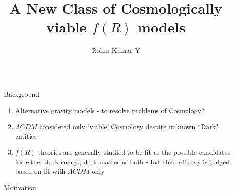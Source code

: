 \documentclass[final,hyperref={pdfpagelabels=false}]{beamer}
\title{\huge A New Class of Cosmologically viable $f(R)$ models} %
\author{Rohin Kumar Y} %
\institute{Department of Physics \& Astrophysics, University of Delhi} %
\begin{document}

\begin{frame}[t] %

\begin{columns}[t] %

\begin{column}{.02\textwidth}\end{column} %

\begin{column}{.465\textwidth} %
%
%
\begin{block}{Background}

\begin{enumerate}
	\item Alternative gravity models - to resolve problems of Cosmology?
	\item $\Lambda CDM$ considered only `viable' Cosmology  despite unknown ``Dark" entities
	\item $f(R)$ theories are generally studied to be fit as the possible candidates for either dark energy, dark matter or both - but their efficacy is judged based on fit with $\Lambda CDM$ only
\end{enumerate}

\end{block}

            
\begin{block}{Motivation}


\end{block}
\end{column}
\end{columns}
\end{frame}
\end{document}
